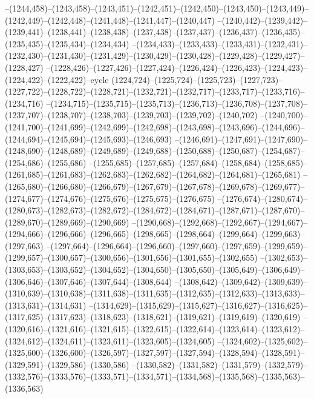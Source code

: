 --(1244,458)--(1243,458)--(1243,451)--(1242,451)--(1242,450)--(1243,450)--(1243,449)--(1242,449)--(1242,448)--(1241,448)--(1241,447)--(1240,447)
--(1240,442)--(1239,442)--(1239,441)--(1238,441)--(1238,438)--(1237,438)--(1237,437)--(1236,437)--(1236,435)--(1235,435)--(1235,434)--(1234,434)
--(1234,433)--(1233,433)--(1233,431)--(1232,431)--(1232,430)--(1231,430)--(1231,429)--(1230,429)--(1230,428)--(1229,428)--(1229,427)--(1228,427)
--(1228,426)--(1227,426)--(1227,424)--(1226,424)--(1226,423)--(1224,423)--(1224,422)--(1222,422)--cycle
(1224,724)--(1225,724)--(1225,723)--(1227,723)--(1227,722)--(1228,722)--(1228,721)--(1232,721)--(1232,717)--(1233,717)--(1233,716)--(1234,716)
--(1234,715)--(1235,715)--(1235,713)--(1236,713)--(1236,708)--(1237,708)--(1237,707)--(1238,707)--(1238,703)--(1239,703)--(1239,702)--(1240,702)
--(1240,700)--(1241,700)--(1241,699)--(1242,699)--(1242,698)--(1243,698)--(1243,696)--(1244,696)--(1244,694)--(1245,694)--(1245,693)--(1246,693)
--(1246,691)--(1247,691)--(1247,690)--(1248,690)--(1248,689)--(1249,689)--(1249,688)--(1250,688)--(1250,687)--(1254,687)--(1254,686)--(1255,686)
--(1255,685)--(1257,685)--(1257,684)--(1258,684)--(1258,685)--(1261,685)--(1261,683)--(1262,683)--(1262,682)--(1264,682)--(1264,681)--(1265,681)
--(1265,680)--(1266,680)--(1266,679)--(1267,679)--(1267,678)--(1269,678)--(1269,677)--(1274,677)--(1274,676)--(1275,676)--(1275,675)--(1276,675)
--(1276,674)--(1280,674)--(1280,673)--(1282,673)--(1282,672)--(1284,672)--(1284,671)--(1287,671)--(1287,670)--(1289,670)--(1289,669)--(1290,669)
--(1290,668)--(1292,668)--(1292,667)--(1294,667)--(1294,666)--(1296,666)--(1296,665)--(1298,665)--(1298,664)--(1299,664)--(1299,663)--(1297,663)
--(1297,664)--(1296,664)--(1296,660)--(1297,660)--(1297,659)--(1299,659)--(1299,657)--(1300,657)--(1300,656)--(1301,656)--(1301,655)--(1302,655)
--(1302,653)--(1303,653)--(1303,652)--(1304,652)--(1304,650)--(1305,650)--(1305,649)--(1306,649)--(1306,646)--(1307,646)--(1307,644)--(1308,644)
--(1308,642)--(1309,642)--(1309,639)--(1310,639)--(1310,638)--(1311,638)--(1311,635)--(1312,635)--(1312,633)--(1313,633)--(1313,631)--(1314,631)
--(1314,629)--(1315,629)--(1315,627)--(1316,627)--(1316,625)--(1317,625)--(1317,623)--(1318,623)--(1318,621)--(1319,621)--(1319,619)--(1320,619)
--(1320,616)--(1321,616)--(1321,615)--(1322,615)--(1322,614)--(1323,614)--(1323,612)--(1324,612)--(1324,611)--(1323,611)--(1323,605)--(1324,605)
--(1324,602)--(1325,602)--(1325,600)--(1326,600)--(1326,597)--(1327,597)--(1327,594)--(1328,594)--(1328,591)--(1329,591)--(1329,586)--(1330,586)
--(1330,582)--(1331,582)--(1331,579)--(1332,579)--(1332,576)--(1333,576)--(1333,571)--(1334,571)--(1334,568)--(1335,568)--(1335,563)--(1336,563)
